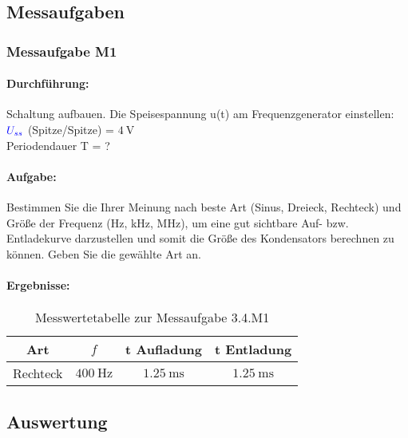 \documentclass[a4paper,titlepage,parskip]{scrreprt}
\newcommand{\spannung}[1]{\textcolor{blue}{#1}}
\begin{document}
            \subsection{Messaufgaben}
                \subsubsection{Messaufgabe M1}
                    \paragraph{Durchführung:}Schaltung aufbauen. Die Speisespannung u(t) am Frequenzgenerator einstellen:\\
					$\spannung{U_{ss}}$ (Spitze/Spitze) = $\SI{4}{\volt}$\\
					Periodendauer T = ?
                    \paragraph{Aufgabe:}Bestimmen Sie die Ihrer Meinung nach beste Art (Sinus, Dreieck, Rechteck) und Größe der Frequenz (Hz, kHz, MHz), um eine gut sichtbare Auf- bzw. Entladekurve
darzustellen und somit die Größe des Kondensators berechnen zu können. Geben Sie
die gewählte Art an.
					\pagebreak
            		\paragraph{Ergebnisse:}
            		\begin{center}
                       \begin{table}[!hbtp]
                           \caption{Messwertetabelle zur Messaufgabe 3.4.M1}
                           \label{tbl:messergebnisse3.4}
                           \renewcommand{\arraystretch}{1.3}
                           \begin{center}
                               \begin{tabular}{cccc}
									Art & $f$ & t Aufladung & t Entladung\\ \hline
									Rechteck & $\SI{400}{\Hz}$ & $\SI{1,25}{\milli\second}$ & $\SI{1,25}{\milli\second}$
							   \end{tabular}
                           \end{center}
                       \end{table}
                   \end{center}
            \subsection{Auswertung}
\end{document}
